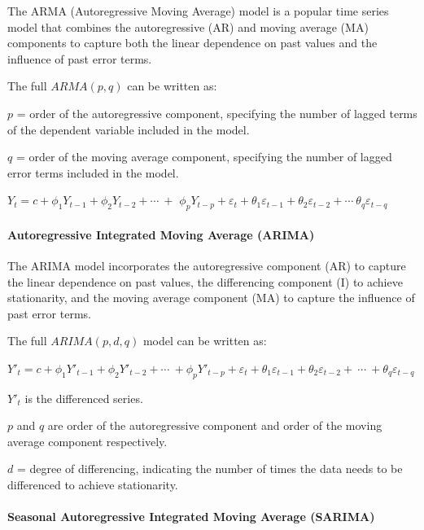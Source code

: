 \documentclass[
]{article}
\begin{document}
The ARMA (Autoregressive Moving Average) model is a popular time series
model that combines the autoregressive (AR) and moving average (MA)
components to capture both the linear dependence on past values and the
influence of past error terms.

The full \(ARMA(p,q)\) can be written as:

\(p\) = order of the autoregressive component, specifying the number of
lagged terms of the dependent variable included in the model.

\(q\) = order of the moving average component, specifying the number of
lagged error terms included in the model.

\(Y_{t} = c + \phi_{1}Y_{t - 1} + \phi_{2}Y_{t - 2} + \cdots\  +\)
\(\phi_{p}Y_{t - p} + \varepsilon_{t} + \theta_{1}\varepsilon_{t - 1} + \theta_{2}\varepsilon_{t - 2} + \cdots\ \theta_{q}\varepsilon_{t - q}\)

\hypertarget{autoregressive-integrated-moving-average-arima}{%
\paragraph{Autoregressive Integrated Moving Average
(ARIMA)}\label{autoregressive-integrated-moving-average-arima}}

The ARIMA model incorporates the autoregressive component (AR) to
capture the linear dependence on past values, the differencing component
(I) to achieve stationarity, and the moving average component (MA) to
capture the influence of past error terms.

The full \(ARIMA (p,d,q)\) model can be written as:

\(Y'_{t} = c + \phi_{1}{Y'}_{t - 1} + \phi_{2}{Y'}_{t - 2} + \cdots\  + \phi_{p}{Y'}_{t - p} + \varepsilon_{t} + \theta_{1}\varepsilon_{t - 1} + \theta_{2}\varepsilon_{t - 2} + \  \cdots \  + \theta_{q}\varepsilon_{t - q}\)

\({Y'}_{t}\) is the differenced series.

\(p\) and \(q\) are order of the autoregressive component and order of
the moving average component respectively.

\(d\) = degree of differencing, indicating the number of times the data
needs to be differenced to achieve stationarity.

\hypertarget{seasonal-autoregressive-integrated-moving-average-sarima}{%
\paragraph{Seasonal Autoregressive Integrated Moving Average
(SARIMA)}\label{seasonal-autoregressive-integrated-moving-average-sarima}}
\end{document}
